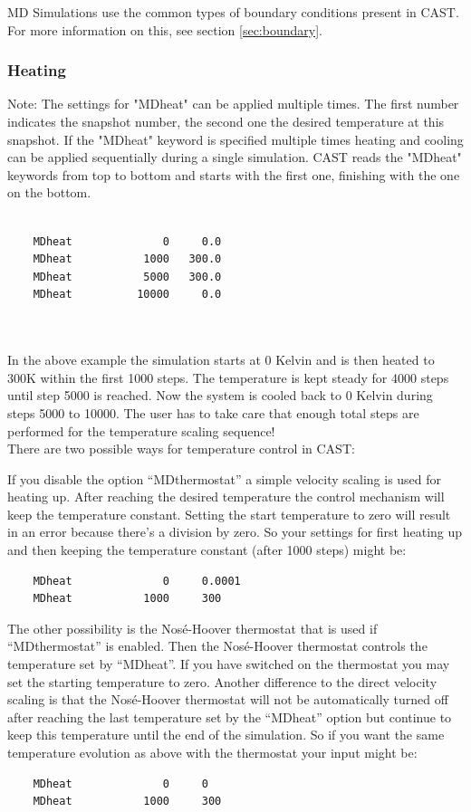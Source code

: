 \documentclass[10pt,a4paper]{article} %
\newif\ifverbose %
\begin{document}
	\ac{MD} Simulations use the common types of boundary conditions present in \ac{CAST}. For more information on this, see section \ref{sec:boundary}.

	\ifverbose
	\subsubsection{Heating}
	Note: The settings for "MDheat" can be applied multiple times. The first number indicates the snapshot number, the second one the desired temperature at this snapshot. If the "MDheat" keyword is specified multiple times heating and cooling can be applied sequentially during a single simulation. \ac{CAST} reads the "MDheat" keywords from top to bottom and starts with the first one, finishing with the one on the bottom.\\~\\
	\begin{lstlisting}
	MDheat			    0  	  0.0
	MDheat 			 1000   300.0
	MDheat			 5000   300.0
	MDheat			10000     0.0
	\end{lstlisting}~\\~\\
	In the above example the simulation starts at 0 Kelvin and is then heated to 300K within the first 1000 steps. The temperature is kept steady for 4000 steps until step 5000 is reached. Now the system is cooled back to 0 Kelvin during steps 5000 to 10000. The user has to take care that enough total steps are performed for the temperature scaling sequence!\\
	
	There are two possible ways for temperature control in CAST: 

If you disable the option ``MDthermostat'' a simple velocity scaling is used for heating up. After reaching the desired temperature the control mechanism will keep the temperature constant. Setting the start temperature to zero will result in an error because there's a division by zero. So your settings for first heating up and then keeping the temperature constant (after 1000 steps) might be:
	\begin{lstlisting}
	MDheat			    0  	  0.0001
	MDheat 			 1000     300
	\end{lstlisting}

	The other possibility is the Nosé-Hoover thermostat that is used if ``MDthermostat'' is enabled. Then the Nosé-Hoover thermostat controls the temperature set by ``MDheat''. If you have switched on the thermostat you may set the starting temperature to zero. Another difference to the direct velocity scaling is that the Nosé-Hoover thermostat will not be automatically turned off after reaching the last temperature set by the ``MDheat'' option but continue to keep this temperature until the end of the simulation. So if you want the same temperature evolution as above with the thermostat your input might be:
		\begin{lstlisting}
	MDheat			    0  	  0
	MDheat 			 1000     300
	\end{lstlisting}
		
\end{document}
